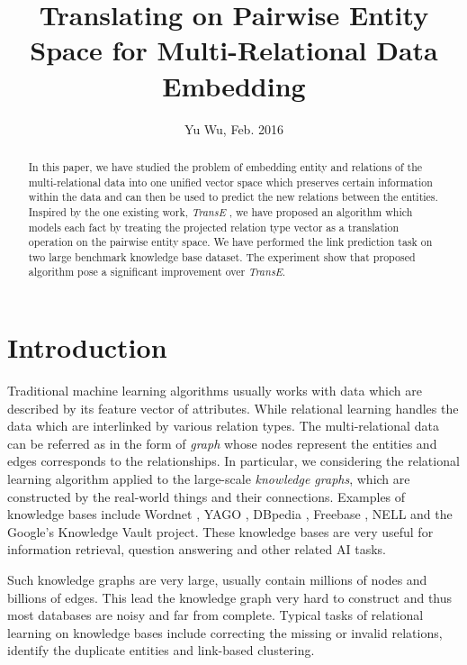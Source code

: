 \documentclass[10pt,journal]{IEEEtran}
\begin{document}
\title{Translating on Pairwise Entity Space for Multi-Relational Data Embedding}
\author{ Yu Wu, Feb. 2016
             }
\maketitle

\begin{abstract}
In this paper, we have studied the problem of embedding entity and relations of the multi-relational data into one unified vector space which preserves certain information within the data and can then be used to predict the new relations between the entities. Inspired by the one existing work, \emph{TransE} \cite{bordes_translating_2013}, we have proposed an algorithm which models each fact by treating the projected relation type vector as a translation operation on the pairwise entity space. We have performed the link prediction task on two large benchmark knowledge base dataset. The experiment show that proposed algorithm pose a significant improvement over  \emph{TransE}.
\end{abstract}

\section{Introduction}
Traditional machine learning algorithms usually works with data  which are described by its feature vector of attributes. While relational learning handles the data which are interlinked by various relation types. The multi-relational data can be referred as in the form of \emph{graph} whose nodes represent the entities and edges corresponds to the relationships. In particular, we considering the relational learning algorithm applied to the large-scale \emph{knowledge graphs}, which are constructed by the real-world things and their connections.  Examples of knowledge bases include Wordnet \cite{miller_wordnet:_1995}, YAGO \cite{suchanek_yago:_2007}, DBpedia \cite{lehmann_dbpedialarge-scale_2015}, Freebase \cite{bollacker_freebase:_2008}, NELL \cite{betteridge_toward_2009} and the Google's Knowledge Vault project\cite{dong_knowledge_2014}.  These knowledge bases are very useful for information retrieval, question answering and other related AI tasks.

Such knowledge graphs are very large, usually contain millions of nodes and billions of edges. This lead the knowledge graph very hard to construct and thus most databases are noisy and far from complete. Typical tasks of relational learning on knowledge bases include correcting the missing or invalid relations, identify the duplicate entities and link-based clustering. 
\end{document}

